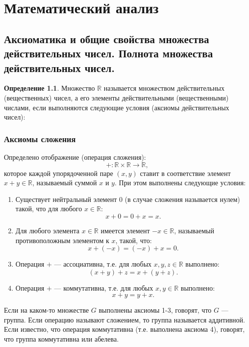 \documentclass[12pt]{report}
\theoremstyle{definition}
\newtheorem{definition}[theorem]{Определение}
\newcommand{\R}{\mathbb R}
\begin{document}
\tableofcontents

\chapter{Математический анализ}

\section{Аксиоматика и общие свойства множества действительных чисел. Полнота множества действительных чисел.}
\begin{definition}
Множество $\R$ называется множеством действительных (вещественных) чисел,
а его элементы действительными (вещественными) числами, если выполняются следующие
условия (аксиомы действительных чисел):
\end{definition}

\subsection{Аксиомы сложения}
Определено отображение (операция сложения):
$$
  +: \R \times \R \rightarrow \R,
$$
которое каждой упорядоченной паре $(x, y)$ ставит в соответствие элемент
$x + y \in \R$, называемый суммой $x$ и $y$.
При этом выполнены следующие условия:

\begin{enumerate}

\item Существует нейтральный элемент $0$ (в случае сложения называется нулем) такой,
что для любого $x\in \R$:
$$
x + 0 = 0 + x = x.
$$

\item Для любого элемента $x \in \R$ имеется элемент $-x \in \R$,
называемый противоположным элементом к $x$, такой, что:
$$
x + (-x) = (-x) + x = 0.
$$

\item Операция $+$ --- ассоциативна, т.е. для любых $x, y, z \in \R$ выполнено:
$$
(x + y) + z = x + (y + z).
$$

\item Операция $+$ --- коммутативна, т.е. для любых $x, y \in \R$ выполнено:
$$
x + y = y + x.
$$

\end{enumerate}

Если на каком-то множестве $G$ выполнены аксиомы 1-3, говорят, что $G$ --- группа.
Если операцию называют сложением, то группа называется аддитивной.
Если известно, что операция коммутативна (т.е. выполнена аксиома 4), говорят, что
группа коммутативна или абелева.
\end{document}
